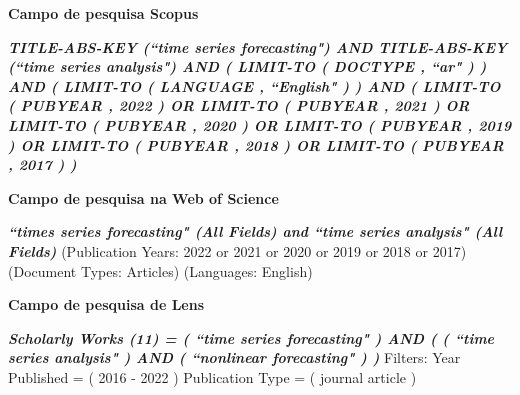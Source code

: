 
\textbf{Campo de pesquisa Scopus}

\textbf{\textit{TITLE-ABS-KEY (``time series forecasting")  AND  TITLE-ABS-KEY (``time series analysis")  AND  ( LIMIT-TO ( DOCTYPE ,  ``ar" ) )  AND  ( LIMIT-TO ( LANGUAGE ,  ``English" ) )  AND  ( LIMIT-TO ( PUBYEAR ,  2022 )  OR LIMIT-TO ( PUBYEAR ,  2021 )  OR  LIMIT-TO ( PUBYEAR ,  2020 )  OR  LIMIT-TO ( PUBYEAR ,  2019 )  OR  LIMIT-TO ( PUBYEAR ,  2018 )  OR  LIMIT-TO ( PUBYEAR ,  2017 ) )}}

\textbf{Campo de pesquisa na Web of Science}

\textit{\textbf{``times series forecasting" (All Fields) and ``time series analysis" (All Fields)}} (Publication Years: 2022 or 2021 or 2020 or 2019 or 2018 or 2017) (Document Types: Articles) (Languages: English)

\textbf{Campo de pesquisa de Lens}

\textit{\textbf{Scholarly Works (11) = ( ``time series forecasting" ) AND ( ( ``time series analysis" ) AND ( ``nonlinear forecasting" ) ) }}
Filters: Year Published = ( 2016 - 2022  ) Publication Type = ( journal article  )\\